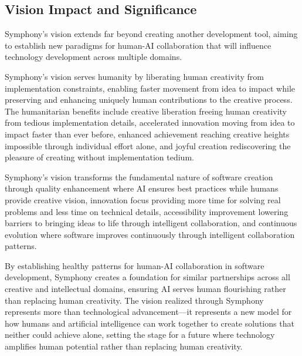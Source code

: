 \subsection{Vision Impact and Significance}

Symphony's vision extends far beyond creating another development tool, aiming to establish new paradigms for human-AI collaboration that will influence technology development across multiple domains.

Symphony's vision serves humanity by liberating human creativity from implementation constraints, enabling faster movement from idea to impact while preserving and enhancing uniquely human contributions to the creative process. The humanitarian benefits include creative liberation freeing human creativity from tedious implementation details, accelerated innovation moving from idea to impact faster than ever before, enhanced achievement reaching creative heights impossible through individual effort alone, and joyful creation rediscovering the pleasure of creating without implementation tedium.

Symphony's vision transforms the fundamental nature of software creation through quality enhancement where AI ensures best practices while humans provide creative vision, innovation focus providing more time for solving real problems and less time on technical details, accessibility improvement lowering barriers to bringing ideas to life through intelligent collaboration, and continuous evolution where software improves continuously through intelligent collaboration patterns.

By establishing healthy patterns for human-AI collaboration in software development, Symphony creates a foundation for similar partnerships across all creative and intellectual domains, ensuring AI serves human flourishing rather than replacing human creativity. The vision realized through Symphony represents more than technological advancement—it represents a new model for how humans and artificial intelligence can work together to create solutions that neither could achieve alone, setting the stage for a future where technology amplifies human potential rather than replacing human creativity.
